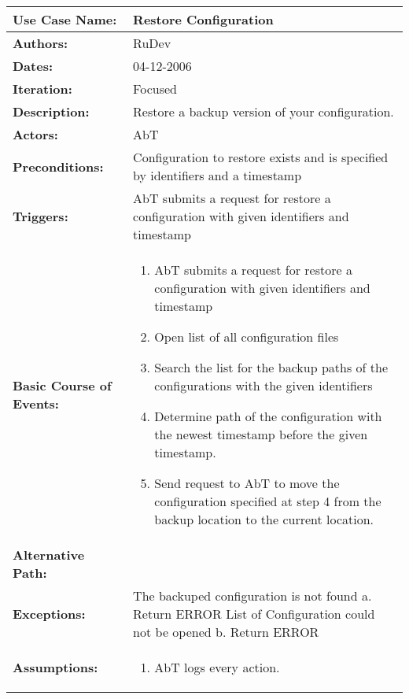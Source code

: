 \begin{tabularx}{\linewidth}{|l|X|}
\hline
\textbf{Use Case Name:} & \textbf{Restore Configuration} \\
\hline
\textbf{Authors:} & RuDev \\
\hline
\textbf{Dates:} & 04-12-2006 \\
\hline
\textbf{Iteration:} & Focused \\
\hline
\textbf{Description:} & Restore a backup version of your configuration. \\
\hline
\textbf{Actors:} & AbT \\
\hline
\textbf{Preconditions:} & Configuration to restore exists and is specified by identifiers and a timestamp \\
\hline
\textbf{Triggers:} & AbT submits a request for restore a configuration with given identifiers and timestamp \\
\hline
\textbf{Basic Course of Events:} & 
\begin{minipage}{\linewidth} 
  \vspace{0.05em}
  \begin{enumerate}
   \item AbT submits a request for restore a configuration with given identifiers and timestamp
   \item Open list of all configuration files
   \item Search the list for the backup paths of the configurations with the given identifiers
   \item Determine path of the configuration with the newest timestamp before the given timestamp.
   \item Send request to AbT to move the configuration specified at step 4 from the backup location to the current location.
  \end{enumerate}
  \vspace{0.05em}
\end{minipage}
\\
\hline 
\textbf{Alternative Path:} &  \\
\hline
\textbf{Exceptions:} & The backuped configuration is not found \newline a. Return ERROR \newline\newline List of Configuration could not be opened \newline b. Return ERROR \\
\hline
\textbf{Assumptions:} & \begin{enumerate} 
							\item AbT logs every action.

\end{enumerate}
\end{tabularx}
